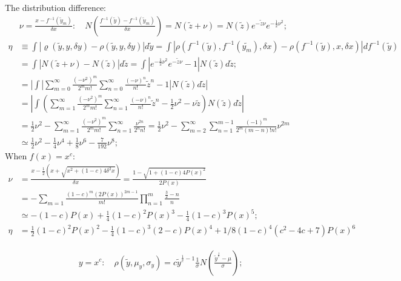 \documentclass[twoside]{article}
\numberwithin{equation}{section}
\begin{document}
The distribution difference:
\begin{align*}
&\nu = \frac{x - f^{-1}(\tilde{y}_m)}{\delta x}: \quad 
 N(\frac{f^{-1}(\tilde{y}) - f^{-1}(\tilde{y}_m)}{\delta x} )
 = N(\tilde{z} + \nu) = N(\tilde{z}) e^{-\tilde{z} \nu} e^{-\frac{1}{2} \nu^2}; \\
\eta &\equiv \int |\varrho(\tilde{y}, y, \delta y) - \rho(\tilde{y}, y, \delta y)| d \tilde{y}
 =  \int |\rho(f^{-1}(\tilde{y}), f^{-1}(\tilde{y_m}), \delta x) - \rho(f^{-1}(\tilde{y}), x, \delta x)| d f^{-1}(\tilde{y}) \\
&= \int |N(\tilde{z} + \nu) - N(\tilde{z})| d \tilde{z} 
 = \int |e^{-\frac{1}{2} \nu^2} e^{-\tilde{z} \nu} - 1| N(\tilde{z}) d \tilde{z}; \\
&= | \int |\sum_{m=0}^{\infty} \frac{(-\nu^2)^m}{2^m m!} \sum_{n=0}^{\infty} \frac{(-\nu)^n}{n!} \tilde{z}^n - 1| 
   N(\tilde{z}) d \tilde{z} | \\
&= | \int \left(\sum_{m=1}^{\infty} \frac{(-\nu^2)^m}{2^m m!} \sum_{n=1}^{\infty} \frac{(-\nu)^n}{n!} \tilde{z}^n
  - \frac{1}{2} \nu^2 - \nu \tilde{z} \right) N(\tilde{z}) d \tilde{z} | \\
&= \frac{1}{2} \nu^2 - \sum_{m=1}^{\infty} \frac{(-\nu^2)^m}{2^m m!} \sum_{n=1}^{\infty} \frac{\nu^{2n}}{2^n n!}
 = \frac{1}{2} \nu^2 - \sum_{m=2}^{\infty} \sum_{n=1}^{m-1} \frac{(-1)^m}{2^m (m - n)! n!} \nu^{2m} \\
&\simeq \frac{1}{2} \nu^2 - \frac{1}{4} \nu^4 + \frac{1}{8} \nu^6 - \frac{7}{192} \nu^8;
\end{align*}
When $f(x)=x^c$:
\begin{align*}
\nu &= \frac{x - \frac{1}{2} (x + \sqrt{x^2 + (1 - c) 4 \delta^2 x})}{\delta x} = \frac{1 - \sqrt{1 + (1 - c) 4 P(x)^2}}{2 P(x)} \\
&= - \sum_{m=1} \frac{(1 - c)^m (2P(x))^{2m - 1}}{m!} \prod_{n=1}^{m} \frac{\frac{3}{2} -n}{n} \\
&\simeq -(1 - c) P(x) + \frac{1}{4} (1 - c)^2 P(x)^3 - \frac{1}{4} (1 - c)^3 P(x)^5; \\
\eta &= \frac{1}{2} (1-c)^2 P(x)^2 - \frac{1}{4} (1-c)^3 (2-c) P(x)^4 + 1/8 (1-c)^4 (c^2-4c+7) P(x)^6
\end{align*}

\begin{align}
\label{eqn: power distribution}
&y = x^c: \quad \rho(\tilde{y}, \mu_y, \sigma_y) = c \tilde{y}^{\frac{1}{c}-1} \frac{1}{\sigma} N(\frac{\tilde{y}^\frac{1}{c} - \mu}{\sigma}); 
\end{align}
\end{document}
